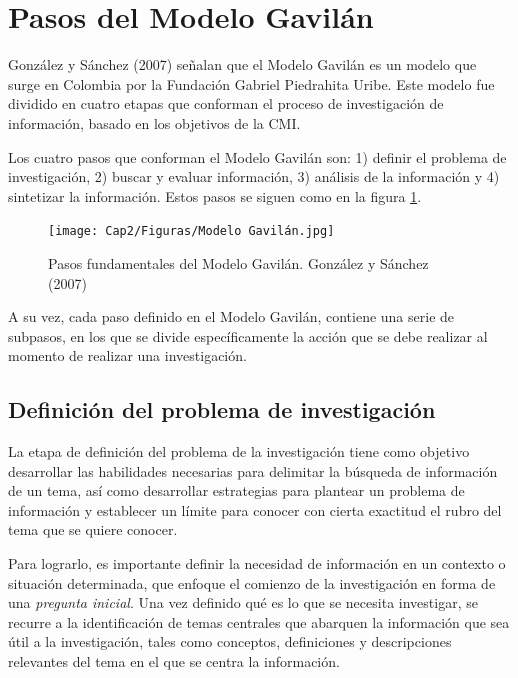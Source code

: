 \section{Pasos del Modelo Gavilán}
\label{secPasosCap2}

González y Sánchez (2007) señalan que el Modelo Gavilán es un modelo que surge en Colombia por la Fundación Gabriel Piedrahita Uribe. Este modelo fue dividido en cuatro etapas que conforman el proceso de investigación de información, basado en los objetivos de la CMI.

Los cuatro pasos que conforman el Modelo Gavilán son: 1) definir el problema de investigación, 2) buscar y evaluar información, 3) análisis de la información y 4) sintetizar la información. Estos pasos se siguen como en la figura \ref{fig:22}.

\begin{figure}
  \centering
  \texttt{[image: Cap2/Figuras/Modelo Gavilán.jpg]}
  \caption{Pasos fundamentales del Modelo Gavilán. González y Sánchez (2007)}
  \label{fig:22}
\end{figure}

A su vez, cada paso definido en el Modelo Gavilán, contiene una serie de subpasos, en los que se divide específicamente la acción que se debe realizar al momento de realizar una investigación.


\subsection{Definición del problema de investigación}
\label{secPaso1Cap2}

La etapa de definición del problema de la investigación tiene como objetivo desarrollar las habilidades necesarias para delimitar la búsqueda de información de un tema, así como desarrollar estrategias para plantear un problema de información y establecer un límite para conocer con cierta exactitud el rubro del tema que se quiere conocer.

Para lograrlo, es importante definir la necesidad de información en un contexto o situación determinada, que enfoque el comienzo de la investigación en forma de una \textit{pregunta inicial}. Una vez definido qué es lo que se necesita investigar, se recurre a la identificación de temas centrales que abarquen la información que sea útil a la investigación, tales como conceptos, definiciones y descripciones relevantes del tema en el que se centra la información.

